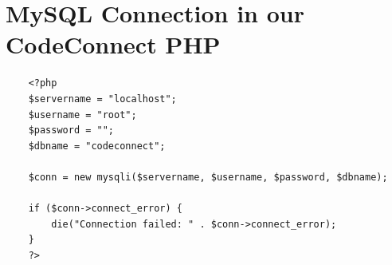 \section{MySQL Connection in our CodeConnect PHP}
\vspace{1cm}
\begin{lstlisting}
    <?php
    $servername = "localhost";
    $username = "root";
    $password = "";
    $dbname = "codeconnect";

    $conn = new mysqli($servername, $username, $password, $dbname);

    if ($conn->connect_error) {
        die("Connection failed: " . $conn->connect_error);
    }
    ?>
    \end{lstlisting}


